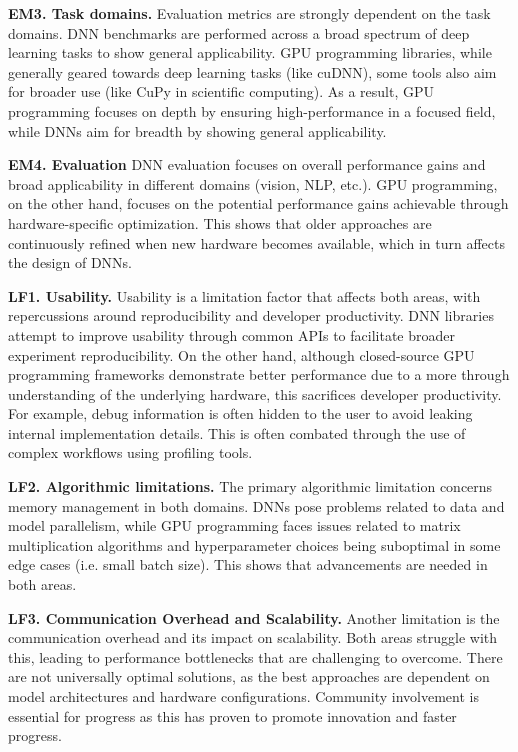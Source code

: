 \textbf{EM3. Task domains.}
Evaluation metrics are strongly dependent on the task domains. DNN benchmarks are performed across
a broad spectrum of deep learning tasks to show general applicability. GPU programming libraries,
while generally geared towards deep learning tasks (like cuDNN), some tools also aim for broader
use (like CuPy in scientific computing). As a result, GPU programming focuses on depth by ensuring
high-performance in a focused field, while DNNs aim for breadth by showing general applicability.

\textbf{EM4. Evaluation}
DNN evaluation focuses on overall performance gains and broad applicability in different domains (vision,
NLP, etc.). GPU programming, on the other hand, focuses on the potential performance gains achievable through
hardware-specific optimization. This shows that older approaches are continuously refined when new hardware
becomes available, which in turn affects the design of DNNs.

\textbf{LF1. Usability.}
Usability is a limitation factor that affects both areas, with repercussions around reproducibility and developer
productivity. DNN libraries attempt to improve usability through common APIs to facilitate broader
experiment reproducibility. On the other hand, although closed-source GPU programming frameworks
demonstrate better performance due to a more through understanding of the underlying hardware, this sacrifices
developer productivity. For example, debug information is often hidden to the user to avoid leaking
internal implementation details. This is often combated through the use of complex workflows using
profiling tools.

\textbf{LF2. Algorithmic limitations.}
The primary algorithmic limitation concerns memory management in both domains.
DNNs pose problems related to data and model parallelism, while GPU programming faces issues
related to matrix multiplication algorithms and hyperparameter choices being suboptimal in some edge cases
(i.e. small batch size). This shows that advancements are needed in both areas.

\textbf{LF3. Communication Overhead and Scalability.}
Another limitation is the communication overhead and its impact on scalability. Both areas struggle
with this, leading to performance bottlenecks that are challenging to overcome. There are not universally
optimal solutions, as the best approaches are dependent on model architectures and hardware configurations.
Community involvement is essential for progress as this has proven to promote innovation and faster progress.

